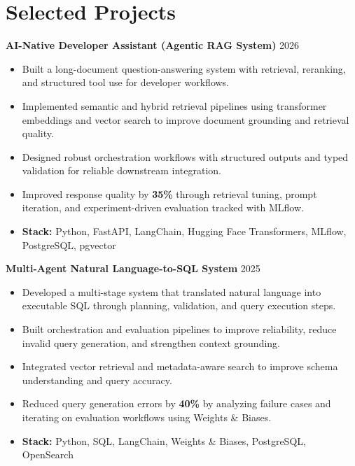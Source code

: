 \documentclass[letterpaper,10pt]{article}
\begin{document}
\section{Selected Projects}

\textbf{AI-Native Developer Assistant (Agentic RAG System)} \hfill 2026
\begin{itemize}
    \item Built a long-document question-answering system with retrieval, reranking, and structured tool use for developer workflows.
    \item Implemented semantic and hybrid retrieval pipelines using transformer embeddings and vector search to improve document grounding and retrieval quality.
    \item Designed robust orchestration workflows with structured outputs and typed validation for reliable downstream integration.
    \item Improved response quality by \textbf{35\%} through retrieval tuning, prompt iteration, and experiment-driven evaluation tracked with MLflow.
    \item \textbf{Stack:} Python, FastAPI, LangChain, Hugging Face Transformers, MLflow, PostgreSQL, pgvector
\end{itemize}

\vspace{3pt}
\textbf{Multi-Agent Natural Language-to-SQL System} \hfill 2025
\begin{itemize}
    \item Developed a multi-stage system that translated natural language into executable SQL through planning, validation, and query execution steps.
    \item Built orchestration and evaluation pipelines to improve reliability, reduce invalid query generation, and strengthen context grounding.
    \item Integrated vector retrieval and metadata-aware search to improve schema understanding and query accuracy.
    \item Reduced query generation errors by \textbf{40\%} by analyzing failure cases and iterating on evaluation workflows using Weights \& Biases.
    \item \textbf{Stack:} Python, SQL, LangChain, Weights \& Biases, PostgreSQL, OpenSearch
\end{itemize}

\end{document}
